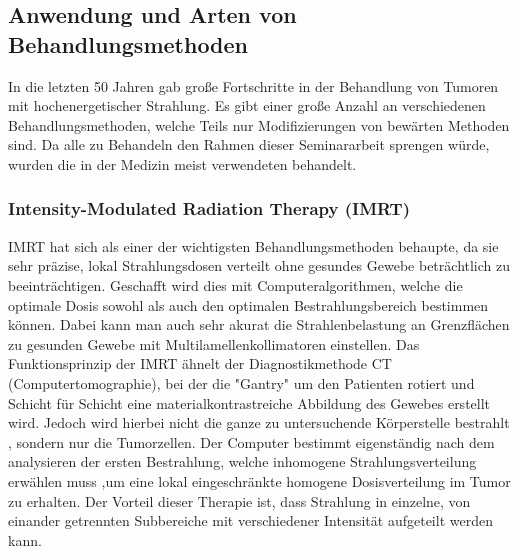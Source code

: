 
\subsection{Anwendung und Arten von Behandlungsmethoden}
In die letzten 50 Jahren gab große Fortschritte in der Behandlung von Tumoren mit hochenergetischer Strahlung.
Es gibt einer große Anzahl an verschiedenen Behandlungsmethoden, welche Teils nur Modifizierungen von bewärten Methoden sind.
Da alle zu Behandeln den Rahmen dieser Seminararbeit sprengen würde, wurden die in der Medizin meist verwendeten behandelt.
\subsubsection{Intensity-Modulated Radiation Therapy (IMRT)}
IMRT hat sich als einer der wichtigsten Behandlungsmethoden behaupte, da sie sehr präzise, lokal Strahlungsdosen verteilt ohne gesundes Gewebe beträchtlich zu beeinträchtigen.
Geschafft wird dies mit Computeralgorithmen, welche die optimale Dosis sowohl als auch den optimalen Bestrahlungsbereich bestimmen können.
Dabei kann man auch sehr akurat die Strahlenbelastung an Grenzflächen zu gesunden Gewebe mit Multilamellenkollimatoren einstellen.
Das Funktionsprinzip der IMRT ähnelt der Diagnostikmethode CT (Computertomographie), bei der die "Gantry" um den Patienten rotiert und Schicht für Schicht eine materialkontrastreiche Abbildung des Gewebes erstellt wird.
Jedoch wird hierbei nicht die ganze zu untersuchende Körperstelle bestrahlt , sondern nur die Tumorzellen.
Der Computer bestimmt eigenständig nach dem analysieren der ersten Bestrahlung, welche inhomogene Strahlungsverteilung erwählen muss ,um eine lokal eingeschränkte homogene Dosisverteilung im Tumor zu erhalten. \cite{teh1999intensity}
Der Vorteil dieser Therapie ist, dass Strahlung in einzelne, von einander getrennten Subbereiche mit verschiedener Intensität aufgeteilt werden kann.

